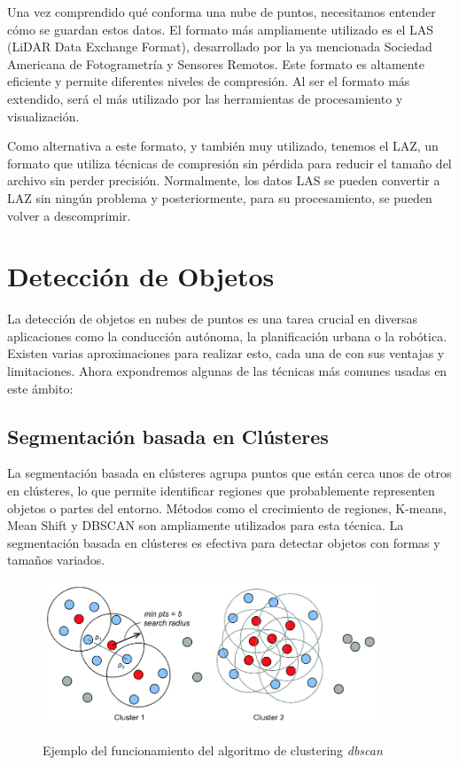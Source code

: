 \vspace{0.5cm}

Una vez comprendido qué conforma una nube de puntos, necesitamos entender cómo se guardan estos datos. El formato más ampliamente utilizado es el LAS (LiDAR Data Exchange Format), desarrollado por la ya mencionada Sociedad Americana de Fotogrametría y Sensores Remotos. Este formato es altamente eficiente y permite diferentes niveles de compresión. Al ser el formato más extendido, será el más utilizado por las herramientas de procesamiento y visualización.

Como alternativa a este formato, y también muy utilizado, tenemos el LAZ, un formato que utiliza técnicas de compresión sin pérdida para reducir el tamaño del archivo sin perder precisión. Normalmente, los datos LAS se pueden convertir a LAZ sin ningún problema y posteriormente, para su procesamiento, se pueden volver a descomprimir.

\section{Detección de Objetos}

La detección de objetos en nubes de puntos es una tarea crucial en diversas aplicaciones como la conducción autónoma, la planificación urbana o la robótica. Existen varias aproximaciones para realizar esto, cada una de con sus ventajas y limitaciones. Ahora expondremos algunas de las técnicas más comunes usadas en este ámbito:

\subsection{Segmentación basada en Clústeres}

La segmentación basada en clústeres agrupa puntos que están cerca unos de otros en clústeres, lo que permite identificar regiones que probablemente representen objetos o partes del entorno. Métodos como el crecimiento de regiones, K-means, Mean Shift y DBSCAN son ampliamente utilizados para esta técnica. La segmentación basada en clústeres es efectiva para detectar objetos con formas y tamaños variados.

\begin{figure}[h]
\centering
\includegraphics[width=10cm]{imaxes/The-DBSCAN-algorithm-and-two-generated-clusters-There-are-three-types-of-points-as.png}
\label{fig:pointnetc}
\caption{Ejemplo del funcionamiento del algoritmo de clustering \textit{dbscan} \cite{dbscan}}
\end{figure}


